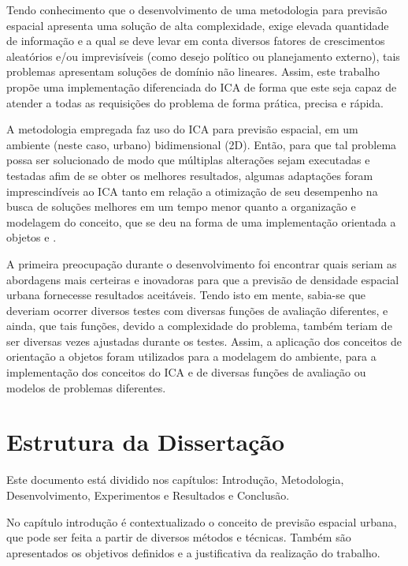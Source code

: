 Tendo conhecimento que o desenvolvimento de uma metodologia para previsão espacial apresenta uma solução de alta complexidade, exige elevada quantidade de informação e a qual se deve levar em conta diversos fatores de crescimentos aleatórios e/ou imprevisíveis (como desejo político ou planejamento externo), tais problemas apresentam soluções de domínio não lineares. Assim, este trabalho propõe uma implementação diferenciada do ICA de forma que este seja capaz de atender a todas as requisições do problema de forma prática, precisa e rápida. 

A metodologia empregada faz uso do ICA para previsão espacial, em um ambiente (neste caso, urbano) bidimensional (2D). Então, para que tal problema possa ser solucionado de modo que múltiplas alterações sejam executadas e testadas afim de se obter os melhores resultados, algumas adaptações foram imprescindíveis ao ICA tanto em relação a otimização de seu desempenho na busca de soluções melhores em um tempo menor  quanto a organização e modelagem do conceito, que se deu na forma de uma implementação orientada a objetos \cite{booch1982object} e \cite{coad1991object}. 

A primeira preocupação durante o desenvolvimento foi encontrar quais seriam as abordagens mais certeiras e inovadoras para que a previsão de densidade espacial urbana fornecesse resultados aceitáveis. Tendo isto em mente, sabia-se que deveriam ocorrer diversos testes com diversas funções de avaliação diferentes, e ainda, que tais funções, devido a complexidade do problema, também teriam de ser diversas vezes ajustadas durante os testes. Assim, a aplicação dos conceitos de orientação a objetos foram utilizados para a modelagem do ambiente, para a implementação dos conceitos do ICA e de diversas funções de avaliação ou modelos de problemas diferentes.





\section{Estrutura da Dissertação}


Este documento está dividido nos capítulos: Introdução, Metodologia, Desenvolvimento, Experimentos e Resultados e Conclusão.

No capítulo introdução é contextualizado o conceito de previsão espacial urbana, que pode ser feita a partir de diversos métodos e técnicas. Também são apresentados os objetivos definidos e a justificativa da realização do trabalho.

